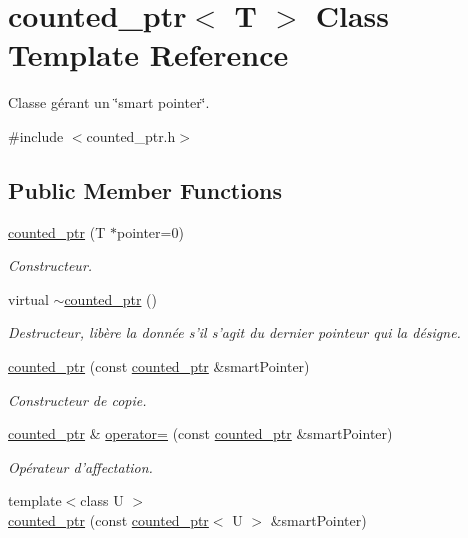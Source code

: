 \hypertarget{classcounted__ptr}{\section{counted\-\_\-ptr$<$ T $>$ Class Template Reference}
\label{classcounted__ptr}
}


Classe gérant un \char`\"{}smart pointer\char`\"{}.  




{\ttfamily \#include $<$counted\-\_\-ptr.\-h$>$}

\subsection*{Public Member Functions}
\begin{DoxyCompactItemize}
\item 
\hyperlink{classcounted__ptr_afc15d9bc04c1be60099294037e9cbdc1}{counted\-\_\-ptr} (T $\ast$pointer=0)
\begin{DoxyCompactList}\small\item\em Constructeur. \end{DoxyCompactList}\item 
virtual \hyperlink{classcounted__ptr_a8b23efee2c3349c85b0acb9cb0c02b88}{$\sim$counted\-\_\-ptr} ()
\begin{DoxyCompactList}\small\item\em Destructeur, libère la donnée s'il s'agit du dernier pointeur qui la désigne. \end{DoxyCompactList}\item 
\hyperlink{classcounted__ptr_a761e66ebb626a54888dd3f29093d02f2}{counted\-\_\-ptr} (const \hyperlink{classcounted__ptr}{counted\-\_\-ptr} \&smart\-Pointer)
\begin{DoxyCompactList}\small\item\em Constructeur de copie. \end{DoxyCompactList}\item 
\hyperlink{classcounted__ptr}{counted\-\_\-ptr} \& \hyperlink{classcounted__ptr_a66a449e044736694d639c0077d1e1053}{operator=} (const \hyperlink{classcounted__ptr}{counted\-\_\-ptr} \&smart\-Pointer)
\begin{DoxyCompactList}\small\item\em Opérateur d'affectation. \end{DoxyCompactList}\item 
{\footnotesize template$<$class U $>$ }\\\hyperlink{classcounted__ptr_afcd57d6c61d5774e1397da21a0e2f875}{counted\-\_\-ptr} (const \hyperlink{classcounted__ptr}{counted\-\_\-ptr}$<$ U $>$ \&smart\-Pointer)

\end{DoxyCompactItemize}
